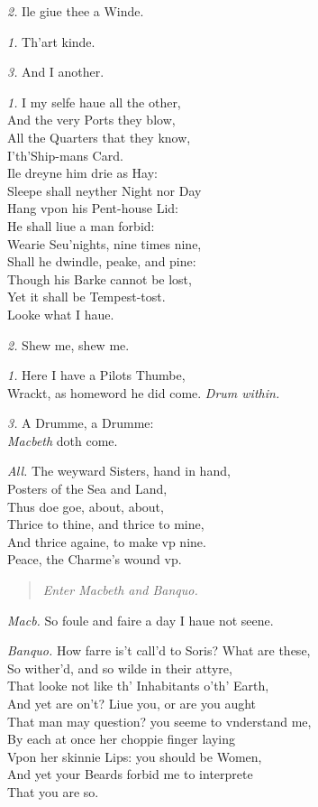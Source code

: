 \documentclass[12pt]{sides}
\newcommand{\StageDir}[1]{\begin{quote}\centering\em #1\end{quote}}
\newcommand{\dia}[1]{\hskip 15pt\textit{#1}\hskip 6pt}
\begin{document}
\begin{multicols}{2}
			\dia{2.} Ile giue thee a Winde.
			
			\dia{1.} Th'art kinde.
			
			\dia{3.} And I another.
			
			\dia{1.} I my selfe haue all the other, \\ And the very Ports they blow, \\ All the Quarters that they know, \\ I'th'Ship-mans Card. \\  Ile dreyne him drie as Hay: \\ Sleepe shall neyther Night nor Day \\ Hang vpon his Pent-house Lid: \\ He shall liue a man forbid: \\ Wearie Seu'nights, nine times nine, \\ Shall he dwindle, peake, and pine: \\ Though his Barke cannot be lost, \\ Yet it shall be Tempest-tost. \\ Looke what I haue.
            
            \dia{2.} Shew me, shew me.

            \dia{1.} Here I have a Pilots Thumbe, \\ Wrackt, as homeword he did come. \hfill\textit{Drum within.} %
            
            \dia{3.} A Drumme, a Drumme: \\ \textit{Macbeth} doth come.

            \dia{All.} The weyward Sisters, hand in hand, \\ Posters of the Sea and Land, \\ Thus doe goe, about, about, \\ Thrice to thine, and thrice to mine, \\ And thrice againe, to make vp nine. \\ Peace, the Charme's wound vp.

            \StageDir{Enter Macbeth and Banquo.}

            \dia{Macb.} So foule and faire a day I haue not seene.
            
            \dia{Banquo.} How farre is't call'd to Soris? What are these, \\ So wither'd, and so wilde in their attyre, \\ That looke not like th' Inhabitants o'th' Earth, \\ And yet are on't? Liue you, or are you aught \\ That man may question? you seeme to vnderstand me, \\ By each at once her choppie finger laying \\ Vpon her skinnie Lips: you should be Women, \\ And yet your Beards forbid me to interprete \\ That you are so.


\end{multicols}
\end{document}
